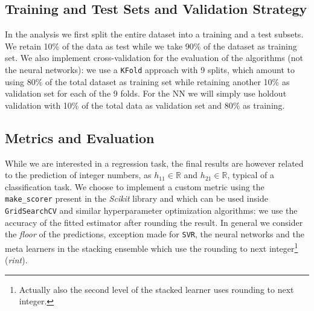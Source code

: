 \subsection{Training and Test Sets and Validation Strategy}
    In the analysis we first split the entire dataset into a training and a test subsets. We retain 10\% of the data as test while we take 90\% of the dataset as training set. We also implement cross-validation for the evaluation of the algorithms (not the neural networks): we use a \texttt{KFold} approach with 9 splits, which amount to using 80\% of the total dataset as training set while retaining another 10\% as validation set for each of the 9 folds. For the NN we will simply use holdout validation with 10\% of the total data as validation set and 80\% as training.
    
\subsection{Metrics and Evaluation}
    While we are interested in a regression task, the final results are however related to the prediction of integer numbers, as $h_{11} \in \mathds{R}$ and $h_{21} \in \mathds{R}$, typical of a classification task. We choose to implement a custom metric using the \texttt{make\_scorer} present in the \textit{Scikit} library and which can be used inside \texttt{GridSearchCV} and similar hyperparameter optimization algorithms: we use the accuracy of the fitted estimator after rounding the result. In general we consider the \textit{floor} of the predictions, exception made for \texttt{SVR}, the neural networks and the meta learners in the stacking ensemble which use the rounding to next integer\footnote{Actually also the second level of the stacked learner uses rounding to next integer.} (\textit{rint}).

